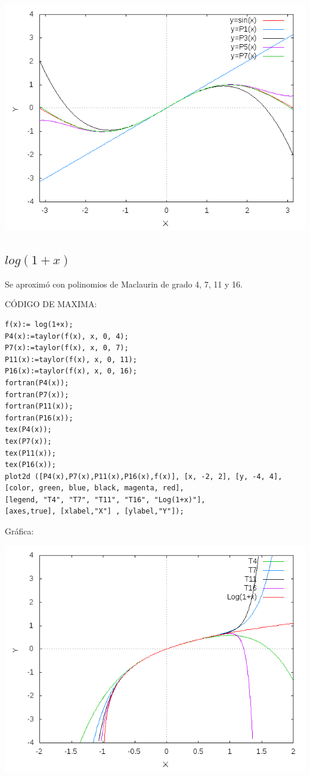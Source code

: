 \documentclass[notitlepage,12pt]{article}
\begin{document}
\includegraphics[scale=0.5]{sinx_ptaylor}

\subsection{$log(1+x)$}
Se aproxim\'o con polinomios de Maclaurin de grado 4, 7, 11 y 16.

C\'ODIGO DE MAXIMA:
\begin{verbatim}
f(x):= log(1+x);
P4(x):=taylor(f(x), x, 0, 4);
P7(x):=taylor(f(x), x, 0, 7);
P11(x):=taylor(f(x), x, 0, 11);
P16(x):=taylor(f(x), x, 0, 16);
fortran(P4(x));
fortran(P7(x));
fortran(P11(x));
fortran(P16(x));
tex(P4(x));
tex(P7(x));
tex(P11(x));
tex(P16(x));
plot2d ([P4(x),P7(x),P11(x),P16(x),f(x)], [x, -2, 2], [y, -4, 4],
[color, green, blue, black, magenta, red],
[legend, "T4", "T7", "T11", "T16", "Log(1+x)"],
[axes,true], [xlabel,"X"] , [ylabel,"Y"]);
\end{verbatim}
Gr\'afica:


\includegraphics[scale=0.5]{log(1+x)_ptaylor}
\end{document}
